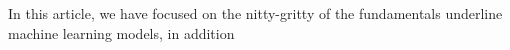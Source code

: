 In this article, we have focused on the nitty-gritty of the fundamentals underline machine learning models, in addition 